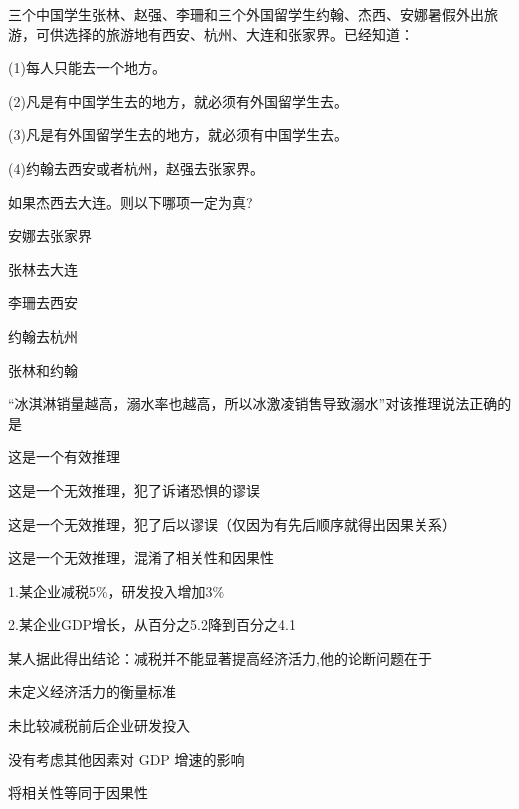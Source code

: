 \documentclass{exam-zh}
\begin{document}
\begin{question}
三个中国学生张林、赵强、李珊和三个外国留学生约翰、杰西、安娜暑假外出旅游，可供选择的旅游地有西安、杭州、大连和张家界。已经知道：

(1)每人只能去一个地方。

(2)凡是有中国学生去的地方，就必须有外国留学生去。

(3)凡是有外国留学生去的地方，就必须有中国学生去。

(4)约翰去西安或者杭州，赵强去张家界。

如果杰西去大连。则以下哪项一定为真? \paren[]

\begin{choices}
  \item 安娜去张家界
  \item 张林去大连
  \item 李珊去西安
  \item 约翰去杭州
  \item 张林和约翰
\end{choices}
\end{question}

\begin{question}
“冰淇淋销量越高，溺水率也越高，所以冰激凌销售导致溺水”对该推理说法正确的是 \paren[]
\begin{choices}
  \item 这是一个有效推理
  \item 这是一个无效推理，犯了诉诸恐惧的谬误
  \item 这是一个无效推理，犯了后以谬误（仅因为有先后顺序就得出因果关系）
  \item 这是一个无效推理，混淆了相关性和因果性
\end{choices}
\end{question}

\begin{question}
1.某企业减税5\%，研发投入增加3\%

2.某企业GDP增长，从百分之5.2降到百分之4.1

某人据此得出结论：减税并不能显著提高经济活力,他的论断问题在于 \paren[]
\begin{choices}
  \item 未定义经济活力的衡量标准
  \item 未比较减税前后企业研发投入
  \item 没有考虑其他因素对 GDP 增速的影响
  \item 将相关性等同于因果性
\end{choices}
\end{question}
\end{document}
